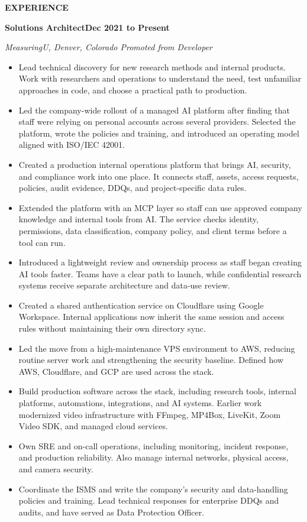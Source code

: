 \documentclass[10pt,letterpaper]{article}
\newcommand{\resumeSection}[1]{%
  \vspace{6pt}%
  {\color{navy}\bfseries\fontsize{11.5}{13}\selectfont\MakeUppercase{#1}}\par
  \vspace{1pt}{\color{navy}\rule{\textwidth}{0.7pt}}\vspace{1.5pt}
}
\newcommand{\roleLine}[3]{%
  {\bfseries\fontsize{11.2}{13}\selectfont #1}\hfill{\bfseries #3}\par
  {\color{muted}\itshape #2}\par
}
\newenvironment{resumeItems}{%
  \begin{itemize}[leftmargin=0.20in,label={\color{navy}\raisebox{0.25ex}{\rule{0.55ex}{0.55ex}}},itemsep=4pt,topsep=2pt,parsep=0pt,partopsep=0pt]
}{\end{itemize}}
\begin{document}
\resumeSection{Experience}
\roleLine{Solutions Architect}{MeasuringU, Denver, Colorado \textbar{} Promoted from Developer}{Dec 2021 to Present}
\begin{resumeItems}
  \item Lead technical discovery for new research methods and internal products. Work with researchers and operations to understand the need, test unfamiliar approaches in code, and choose a practical path to production.
  \item Led the company-wide rollout of a managed AI platform after finding that staff were relying on personal accounts across several providers. Selected the platform, wrote the policies and training, and introduced an operating model aligned with ISO/IEC 42001.
  \item Created a production internal operations platform that brings AI, security, and compliance work into one place. It connects staff, assets, access requests, policies, audit evidence, DDQs, and project-specific data rules.
  \item Extended the platform with an MCP layer so staff can use approved company knowledge and internal tools from AI. The service checks identity, permissions, data classification, company policy, and client terms before a tool can run.
  \item Introduced a lightweight review and ownership process as staff began creating AI tools faster. Teams have a clear path to launch, while confidential research systems receive separate architecture and data-use review.
  \item Created a shared authentication service on Cloudflare using Google Workspace. Internal applications now inherit the same session and access rules without maintaining their own directory sync.
  \item Led the move from a high-maintenance VPS environment to AWS, reducing routine server work and strengthening the security baseline. Defined how AWS, Cloudflare, and GCP are used across the stack.
  \item Build production software across the stack, including research tools, internal platforms, automations, integrations, and AI systems. Earlier work modernized video infrastructure with FFmpeg, MP4Box, LiveKit, Zoom Video SDK, and managed cloud services.
  \item Own SRE and on-call operations, including monitoring, incident response, and production reliability. Also manage internal networks, physical access, and camera security.
  \item Coordinate the ISMS and write the company's security and data-handling policies and training. Lead technical responses for enterprise DDQs and audits, and have served as Data Protection Officer.
\end{resumeItems}
\end{document}
